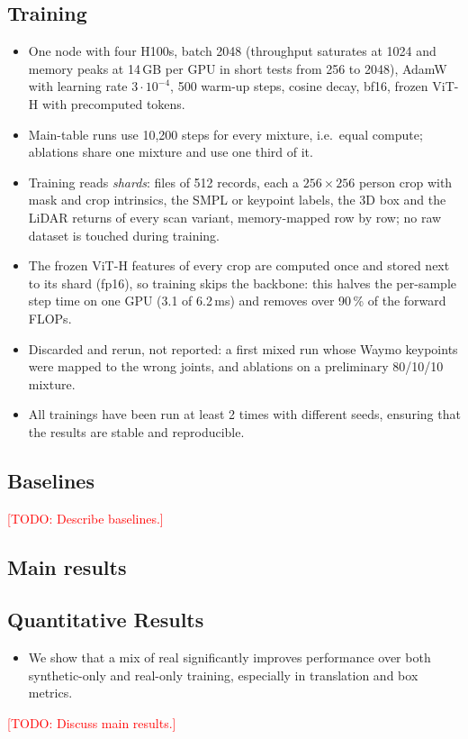 \documentclass{egpubl}
\newcommand{\todo}[1]{\textcolor{red}{[TODO: #1]}}
\begin{document}
\subsection{Training}
\begin{itemize}
  \item One node with four H100s, batch 2048 (throughput saturates at
    1024 and memory peaks at 14\,GB per GPU in short tests from 256 to
    2048), AdamW with learning rate $3\cdot10^{-4}$, 500 warm-up steps,
    cosine decay, bf16, frozen ViT-H with precomputed tokens.
  \item Main-table runs use 10{,}200 steps for every mixture, i.e.\ equal
    compute; ablations share one mixture and use one third of it.
  \item Training reads \emph{shards}: files of 512 records, each a
    $256\times256$ person crop with mask and crop intrinsics, the SMPL or
    keypoint labels, the 3D box and the LiDAR returns of every scan
    variant, memory-mapped row by row; no raw dataset is touched during
    training.
  \item The frozen ViT-H features of every crop are computed once and
    stored next to its shard (fp16), so training skips the backbone: this
    halves the per-sample step time on one GPU (3.1 of 6.2\,ms) and removes
    over 90\,\% of the forward FLOPs.
  \item Discarded and rerun, not reported: a first mixed run whose Waymo
    keypoints were mapped to the wrong joints, and ablations on a
    preliminary 80/10/10 mixture.
  \item All trainings have been run at least 2 times with different seeds, ensuring that the results are stable and reproducible.
\end{itemize}

\subsection{Baselines}
\todo{Describe baselines.}

\subsection{Main results}
\subsection{Quantitative Results}
\begin{itemize}
  \item We show that a mix of real significantly improves performance over both synthetic-only and real-only training, especially in translation and box metrics.
\end{itemize}
\todo{Discuss main results.}
\end{document}
